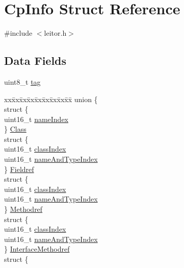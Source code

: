 \hypertarget{structCpInfo}{}\section{Cp\+Info Struct Reference}
\label{structCpInfo}


{\ttfamily \#include $<$leitor.\+h$>$}

\subsection*{Data Fields}
\begin{DoxyCompactItemize}
\item 
uint8\+\_\+t \hyperlink{structCpInfo_ac20d96c33f871bde2e903708a215a2dc}{tag}
\item 
\begin{tabbing}
xx\=xx\=xx\=xx\=xx\=xx\=xx\=xx\=xx\=\kill
union \{\\
\>struct \{\\
\>\>uint16\_t \hyperlink{structCpInfo_a33528d25dc35e61040a6ad480d6f9959}{nameIndex}\\
\>\} \hyperlink{structCpInfo_a198cb29d17d3d19a64f02efe6a6f966f}{Class}\\
\>struct \{\\
\>\>uint16\_t \hyperlink{structCpInfo_a75f3e96c3f2b5bb18c3d0caa02b589ca}{classIndex}\\
\>\>uint16\_t \hyperlink{structCpInfo_a3b8ac741223fb96194b9a06ad278850f}{nameAndTypeIndex}\\
\>\} \hyperlink{structCpInfo_a9fd65fbc888e07e594eb9fe740bca5d6}{Fieldref}\\
\>struct \{\\
\>\>uint16\_t \hyperlink{structCpInfo_a75f3e96c3f2b5bb18c3d0caa02b589ca}{classIndex}\\
\>\>uint16\_t \hyperlink{structCpInfo_a3b8ac741223fb96194b9a06ad278850f}{nameAndTypeIndex}\\
\>\} \hyperlink{structCpInfo_a66dc9eccd00ceddf9395d73cf680b398}{Methodref}\\
\>struct \{\\
\>\>uint16\_t \hyperlink{structCpInfo_a75f3e96c3f2b5bb18c3d0caa02b589ca}{classIndex}\\
\>\>uint16\_t \hyperlink{structCpInfo_a3b8ac741223fb96194b9a06ad278850f}{nameAndTypeIndex}\\
\>\} \hyperlink{structCpInfo_a43f1ac70e4d86c838c644a73c911279d}{InterfaceMethodref}\\
\>struct \{\\

\end{tabbing}
\end{DoxyCompactItemize}
